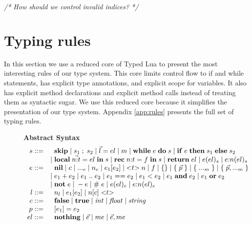 \textit{/* How should we control invalid indices? */}

\section{Typing rules}

In this section we use a reduced core of Typed Lua to present the
most interesting rules of our type system.
This core limits control flow to if and while statements,
has explicit type annotations, and explicit scope for variables.
It also has explicit method declarations and explicit method calls
instead of treating them as syntactic sugar.
We use this reduced core because it simplifies the presentation
of our type system.
Appendix \ref{app:rules} presents the full set of typing rules.

\begin{figure}[!ht]
\textbf{Abstract Syntax}\\
\dstart
$$
\begin{array}{rl}
s ::= & \;\; \mathbf{skip} \; | \;
s_{1} \; ; \; s_{2} \; | \;
\vec{l} = el \; | \;
m \; | \;
\mathbf{while} \; e \; \mathbf{do} \; s \; | \;
\mathbf{if} \; e \; \mathbf{then} \; s_{1} \; \mathbf{else} \; s_{2}\\
& | \; \mathbf{local} \; \vec{n{:}t} = el \; \mathbf{in} \; s \; | \;
\mathbf{rec} \; n{:}t = f \; \mathbf{in} \; s \; | \;
\mathbf{return} \; el \; | \;
e(el)_{s} \; | \;
e{:}n(el)_{s}\\
e ::= & \;\; \mathbf{nil} \; | \;
c \; | \;
{...}_{e} \; | \;
n_{e} \; | \;
e_{1}[e_{2}] \; | \;
{<}t{>} \; n \; | \;
f \; | \;
\{ \} \; | \;
\{ \; \vec{p} \; \} \; | \;
\{ \; {...}_{m} \; \} \; | \;
\{ \; \vec{p},{...}_{m} \; \}\\
& | \; e_{1} + e_{2} \; | \;
e_{1} \; {..} \; e_{2} \; | \;
e_{1} == e_{2} \; | \;
e_{1} < e_{2} \; | \;
e_{1} \; \mathbf{and} \; e_{2} \; | \;
e_{1} \; \mathbf{or} \; e_{2} \\
& | \; \mathbf{not} \; e \; | \;
- e \; | \;
\# \; e \; | \;
e(el)_{e} \; | \;
e{:}n(el)_{e}\\
l ::= & \;\; n_{l} \; | \;
e_{1}[e_{2}] \; | \;
n[c] \; {<}t{>}\\
c ::= & \;\; \mathbf{false} \; | \;
\mathbf{true} \; | \;
{\it int} \; | \;
{\it float} \; | \;
{\it string}\\
p ::= & \;\; [e_{1}] = e_{2}\\
el ::= & \;\; \mathbf{nothing} \; | \;
\vec{e} \; | \;
me \; | \;
\vec{e}, me\\

\end{array}$$
\end{figure}
